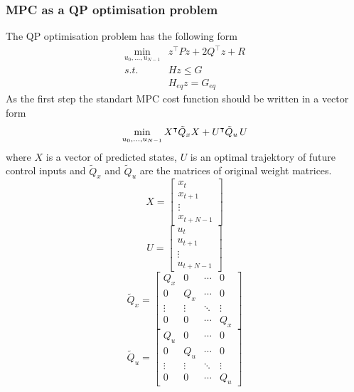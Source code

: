 \subsubsection{MPC as a QP optimisation problem}
The QP optimisation problem has the following form
\begin{subequations}
	\begin{align}
	\min_{u_0,...,u_{N-1}} & z^\intercal Pz + 2Q^\intercal z + R\\
	\label{cst_qp}s.t.\quad&Hz\leq G\\
	&H_{eq}z = G_{eq}
	\end{align}
\end{subequations}
As the first step the standart MPC cost function should be written in a vector form
\begin{equation}
	\min_{u_0,...,u_{N-1}} X^\intercal\tilde{Q}_xX + U^\intercal\tilde{Q}_u\,U\\
\end{equation}
where $X$ is a vector of predicted states, $U$ is an optimal trajektory of future control inputs and $\tilde{Q}_x$ and $\tilde{Q}_u$ are the matrices of original weight matrices.
\begin{equation}
	X = \begin{bmatrix}
	x_t\\x_{t+1}\\\vdots\\x_{t+N-1}
	\end{bmatrix}
\end{equation}
\begin{equation}
U = \begin{bmatrix}
u_t\\u_{t+1}\\\vdots\\u_{t+N-1}
\end{bmatrix}
\end{equation}
\begin{equation}
\tilde{Q}_x = \begin{bmatrix}
Q_x&0&\cdots&0\\
0&Q_x&\cdots&0\\
\vdots&\vdots&\ddots&\vdots\\
0&0&\cdots&Q_x
\end{bmatrix}
\end{equation}
\begin{equation}
\tilde{Q}_u = \begin{bmatrix}
Q_u&0&\cdots&0\\
0&Q_u&\cdots&0\\
\vdots&\vdots&\ddots&\vdots\\
0&0&\cdots&Q_u
\end{bmatrix}
\end{equation}
